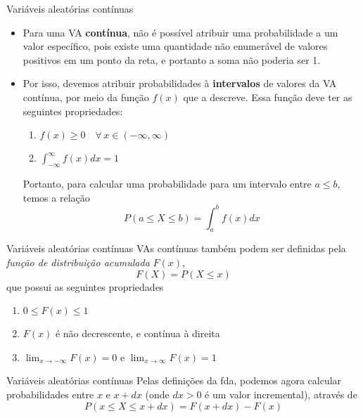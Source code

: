 \documentclass[10pt]{beamer}\usepackage{graphicx, color}
\begin{document}
\begin{frame}{Variáveis aleatórias contínuas}
  \begin{itemize}
  \item Para uma VA \textbf{contínua}, não é possível atribuir uma
    probabilidade a um valor específico, pois existe uma quantidade não
    enumerável de valores positivos em um ponto da reta, e portanto a
    soma não poderia ser 1.
  \item Por isso, devemos atribuir probabilidades à \textbf{intervalos} de
    valores da VA contínua, por meio da função $f(x)$ que a
    descreve. Essa função deve ter as seguintes propriedades:
    \begin{enumerate}
    \item $f(x) \geq 0 \quad \forall\, x \in (-\infty,\infty)$
    \item $\int_{-\infty}^{\infty} f(x) dx = 1$
    \end{enumerate}
    Portanto, para calcular uma probabilidade para um intervalo entre $a
    \leq b$, temos a relação
    \begin{equation*}
      P(a \leq X \leq b) = \int_{a}^{b} f(x) dx
    \end{equation*}
  \end{itemize}
\end{frame}

\begin{frame}{Variáveis aleatórias contínuas}
  VAs contínuas também podem ser definidas pela \textit{função de
    distribuição acumulada} $F(x)$,
  \begin{equation*}
    F(X) = P(X \leq x)
  \end{equation*}
  que possui as seguintes propriedades
  \begin{enumerate}
  \item $0 \leq F(x) \leq 1$
  \item $F(x)$ é não decrescente, e contínua à direita
  \item $\lim_{x \rightarrow -\infty} F(x) = 0$ e
    $\lim_{x \rightarrow \infty} F(x) = 1$
  \end{enumerate}
\end{frame}

\begin{frame}{Variáveis aleatórias contínuas}
  Pelas definições da fda, podemos agora calcular probabilidades entre
  $x$ e $x + dx$ (onde $dx > 0$ é um valor incremental), através de
  \begin{equation*}
    P(x \leq X \leq x + dx) = F(x + dx) - F(x)
  \end{equation*}
\end{frame}
\end{document}
